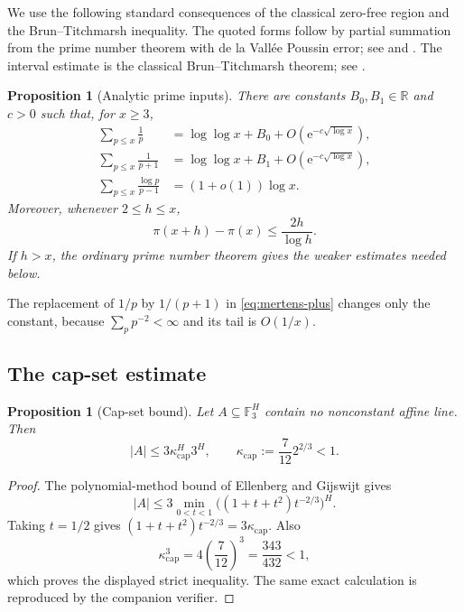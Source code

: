 \documentclass[11pt]{article}
\numberwithin{equation}{section}
\theoremstyle{plain}
\newtheorem{proposition}[theorem]{Proposition}
\newcommand{\F}{\mathbb F}
\newcommand{\1}{\mathbf 1}
\newcommand{\e}{\mathrm e}
\newcommand{\kappacap}{\kappa_{\mathrm{cap}}}
\begin{document}
We use the following standard consequences of the classical zero-free
region and the Brun--Titchmarsh inequality.  The quoted forms follow by
partial summation from the prime number theorem with de la Vall\'ee Poussin
error; see \cite[Chapters~2 and~6]{MontgomeryVaughan} and
\cite[Chapters~5 and~6]{IwaniecKowalski}.  The interval estimate is the
classical Brun--Titchmarsh theorem; see
\cite{MontgomeryVaughanLargeSieve}.

\begin{proposition}[Analytic prime inputs]\label{prop:prime-inputs}
There are constants $B_0,B_1\in\mathbb R$ and $c>0$ such that, for
$x\ge3$,
\begin{align}
 \sum_{p\le x}\frac1p
   &=\log\log x+B_0+O\!\left(\e^{-c\sqrt{\log x}}\right),
                                                        \label{eq:mertens-recip}\\
 \sum_{p\le x}\frac1{p+1}
   &=\log\log x+B_1+O\!\left(\e^{-c\sqrt{\log x}}\right),
                                                        \label{eq:mertens-plus}\\
 \sum_{p\le x}\frac{\log p}{p-1}
   &=(1+o(1))\log x.                                  \label{eq:weighted-prime}
\end{align}
Moreover, whenever $2\le h\le x$,
\begin{equation}\label{eq:brun-titchmarsh}
 \pi(x+h)-\pi(x)\le\frac{2h}{\log h}.
\end{equation}
If $h>x$, the ordinary prime number theorem gives the weaker estimates
needed below.
\end{proposition}

The replacement of $1/p$ by $1/(p+1)$ in
\eqref{eq:mertens-plus} changes only the constant, because
$\sum_p p^{-2}<\infty$ and its tail is $O(1/x)$.

\subsection{The cap-set estimate}

\begin{proposition}[Cap-set bound]\label{prop:cap-set}
Let $A\subseteq\F_3^H$ contain no nonconstant affine line.  Then
\begin{equation}\label{eq:cap-set}
 |A|\le 3\kappacap^H3^H,
 \qquad
 \kappacap:=\frac7{12}2^{2/3}<1.
\end{equation}
\end{proposition}

\begin{proof}
The polynomial-method bound of Ellenberg and Gijswijt
\cite{EllenbergGijswijt} gives
\[
 |A|\le3\min_{0<t<1}
       \bigl((1+t+t^2)t^{-2/3}\bigr)^H.
\]
Taking $t=1/2$ gives
$(1+t+t^2)t^{-2/3}=3\kappacap$.  Also
\[
 \kappacap^3=4\left(\frac7{12}\right)^3
             =\frac{343}{432}<1,
\]
which proves the displayed strict inequality.  The same exact calculation
is reproduced by the companion verifier.
\end{proof}
\end{document}
